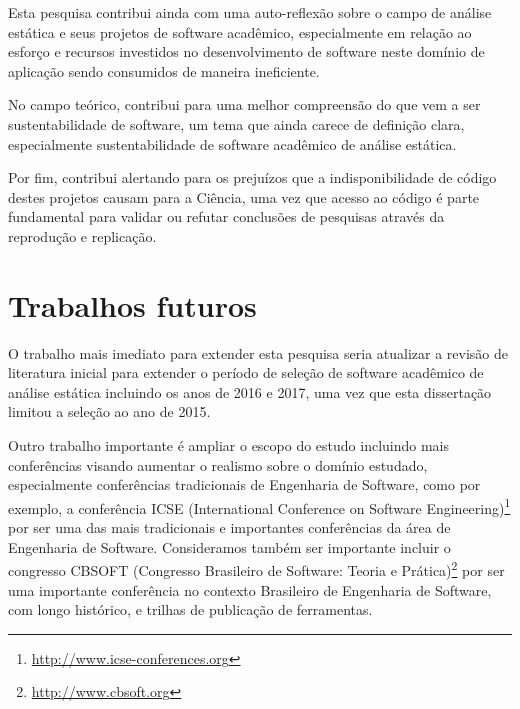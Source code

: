 Esta pesquisa contribui ainda com uma auto-reflexão sobre o campo de análise
estática e seus projetos de software acadêmico, especialmente em relação ao
esforço e recursos investidos no desenvolvimento de software neste domínio de
aplicação sendo consumidos de maneira ineficiente.


No campo teórico, contribui para uma melhor compreensão do que vem a ser
sustentabilidade de software, um tema que ainda carece de definição clara,
especialmente sustentabilidade de software acadêmico de análise estática.


Por fim, contribui alertando para os prejuízos que a indisponibilidade de
código destes projetos causam para a Ciência, uma vez que acesso ao código é
parte fundamental para validar ou refutar conclusões de pesquisas através da
reprodução e replicação.



\section{Trabalhos futuros}

O trabalho mais imediato para extender esta pesquisa seria atualizar a revisão
de literatura inicial para extender o período de seleção de software acadêmico
de análise estática incluindo os anos de 2016 e 2017, uma vez que esta
dissertação limitou a seleção ao ano de 2015.

Outro trabalho importante é ampliar o escopo do estudo incluindo mais
conferências visando aumentar o realismo sobre o domínio estudado,
especialmente conferências tradicionais de Engenharia de Software, como por
exemplo, a conferência ICSE (International Conference on Software
Engineering)\footnote{\url{http://www.icse-conferences.org}} por ser uma das
mais tradicionais e importantes conferências da área de Engenharia de Software.
Consideramos também ser importante incluir o congresso CBSOFT (Congresso
Brasileiro de Software: Teoria e Prática)\footnote{\url{http://www.cbsoft.org}}
por ser uma importante conferência no contexto Brasileiro de Engenharia de
Software, com longo histórico, e trilhas de publicação de ferramentas.


